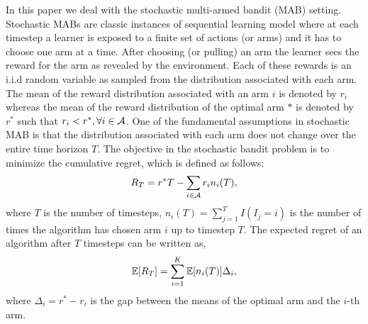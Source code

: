 In this paper we deal with the stochastic multi-armed bandit (MAB) setting. Stochastic MABs are classic instances of sequential learning model where at each timestep a learner is exposed to a finite set of actions (or arms) and it has to choose one arm at a time. After choosing (or pulling) an arm the learner sees the reward for the arm as revealed by the environment. Each of these rewards is an i.i.d random variable as sampled from the distribution associated with each arm. The mean of the reward distribution associated with an arm $i$ is denoted by $r_i$ whereas the mean of the reward distribution of the optimal arm $*$ is denoted by $r^*$ such that $r_i < r^*, \forall i\in \mathcal{A}$. One of the fundamental assumptions in stochastic MAB is that the distribution associated with each arm does not change over the entire time horizon $T$. The objective in the stochastic bandit problem is to minimize the cumulative regret, which is defined as follows:
\begin{align*}
R_{T}=r^{*}T - \sum_{i\in \mathcal{A}} r_{i}n_{i}(T),
\end{align*}
where $T$ is the number of timesteps, $n_{i}(T)=\sum_{j=1}^T I(I_j=i)$ is the number of times the algorithm has chosen arm $i$ up to timestep $T$.
The expected regret of an algorithm after $T$ timesteps can be written as,
\begin{align*}
\mathbb{E}[R_{T}]= \sum_{i=1}^K \mathbb{E}[n_i (T)] \Delta_i,
\end{align*}
where $\Delta_{i}=r^{*}-r_{i}$ is the gap between the means of the optimal arm and the $i$-th arm.